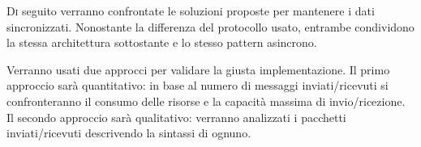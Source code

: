 \lettrine{D}{i} seguito verranno confrontate le soluzioni proposte per mantenere i dati sincronizzati.
Nonostante la differenza del protocollo usato, entrambe condividono la stessa architettura sottostante e lo stesso pattern asincrono.

Verranno usati due approcci per validare la giusta implementazione.
Il primo approccio sarà quantitativo: in base al numero di messaggi inviati/ricevuti si confronteranno il consumo delle risorse e la capacità massima di invio/ricezione.
Il secondo approccio sarà qualitativo: verranno analizzati i pacchetti inviati/ricevuti descrivendo la sintassi di ognuno.
